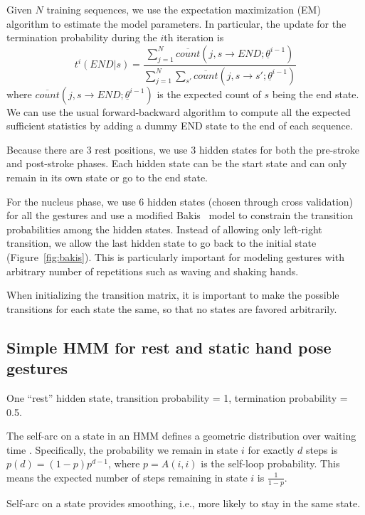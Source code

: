 Given $N$ training sequences, we use the expectation maximization (EM) algorithm to estimate the model parameters. In
particular, the update for the termination probability during the $i$th iteration is 
\begin{displaymath}
t^i(END|s) = \frac{\sum_{j = 1}^N \overline{count}(j, s\rightarrow END;\underline{\theta}^{i-1})}
    {\sum_{j = 1}^N\sum_{s'} \overline{count}(j, s\rightarrow s';\underline{\theta}^{i-1})}
\end{displaymath}
where $\overline{count}(j, s\rightarrow END;\underline{\theta}^{i-1})$ is the expected count of 
$s$ being the end state. We can use the usual forward-backward algorithm to compute all the 
expected sufficient statistics by adding a dummy END state to the end of each sequence.

Because there are 3 rest positions, we use 3 hidden states for both the pre-stroke and post-stroke phases.
Each hidden state can be the start state and can only remain in its own state or go to the end state.
 
For the nucleus phase, we use 6 hidden states (chosen through cross validation) for all the gestures and use a modified Bakis~\cite{bauer2000} model to constrain the transition probabilities
among the hidden states. Instead of allowing only left-right transition, we allow the last hidden state
to go back to the initial state (Figure~\ref{fig:bakis}). This is particularly important for modeling gestures with arbitrary number of
repetitions such as waving and shaking hands. 

When initializing the transition matrix, it is important to make the possible
transitions for each state the same, so that no states are favored arbitrarily.

\subsection{Simple HMM for rest and static hand pose gestures}
One ``rest'' hidden state, transition probability = 1, termination probability =
0.5.

The self-arc on a state in an HMM defines a geometric distribution over waiting
time \cite{murphy02}. Specifically, the probability we remain in state $i$ for
exactly $d$ steps is $p(d) = (1 - p)p^{d - 1}$, where $p = A(i, i)$ is the
self-loop probability. This means the expected number of steps remaining in
state $i$ is $\frac{1}{1 - p}$.

Self-arc on a state provides smoothing, i.e., more likely to stay in the same
state.

